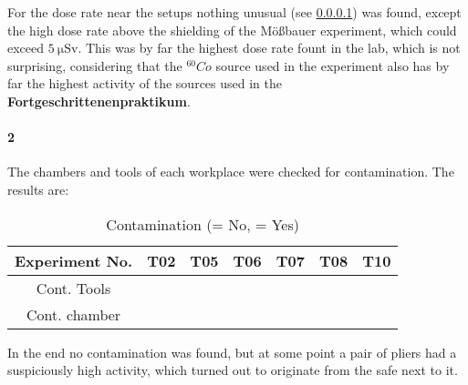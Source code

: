 \documentclass[12pt,twoside,a4paper]{scrartcl}
\newcommand{\xmark}{\ding{55}}%
\begin{document}
			For the dose rate near the setups nothing unusual (see \ref{Contamination}) was found, except the high dose rate above the shielding of the Mößbauer experiment, which could exceed $\SI{5}{\micro \sievert}$. This was by far the highest dose rate fount in the lab, which is not surprising, considering that the $^60Co$ source used in the experiment also has by far the highest activity of the sources used in the \textbf{Fortgeschrittenenpraktikum}.

		\paragraph{2}
		\label{Contamination}
			The chambers and tools of each workplace were checked for contamination. The results are:

			\begin{table}[H]
				\centering
				\caption{Contamination (\xmark = No, \checkmark = Yes)}
				\begin{tabular}{|c|c|c|c|c|c|c|}
					\hline
					Experiment No. & T02 & T05 & T06 & T07 & T08 & T10 \\ \hline
					Cont. Tools 	 & \xmark & \xmark & \xmark & \xmark & \xmark & \xmark \\
					Cont. chamber  & \xmark & \xmark & \xmark & \xmark & \xmark & \xmark \\ \hline
				\end{tabular}
			\end{table}

			In the end no contamination was found, but at some point a pair of pliers had a suspiciously high activity, which turned out to originate from the safe next to it.
\end{document}
